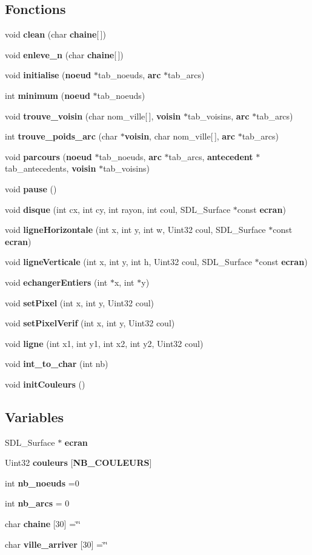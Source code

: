 \subsection*{Fonctions}
\begin{DoxyCompactItemize}
\item 
void {\bf clean} (char {\bf chaine}[$\,$])
\item 
void {\bf enleve\+\_\+n} (char {\bf chaine}[$\,$])
\item 
void {\bf initialise} ({\bf noeud} $\ast$tab\+\_\+noeuds, {\bf arc} $\ast$tab\+\_\+arcs)
\item 
int {\bf minimum} ({\bf noeud} $\ast$tab\+\_\+noeuds)
\item 
void {\bf trouve\+\_\+voisin} (char nom\+\_\+ville[$\,$], {\bf voisin} $\ast$tab\+\_\+voisins, {\bf arc} $\ast$tab\+\_\+arcs)
\item 
int {\bf trouve\+\_\+poids\+\_\+arc} (char $\ast${\bf voisin}, char nom\+\_\+ville[$\,$], {\bf arc} $\ast$tab\+\_\+arcs)
\item 
void {\bf parcours} ({\bf noeud} $\ast$tab\+\_\+noeuds, {\bf arc} $\ast$tab\+\_\+arcs, {\bf antecedent} $\ast$tab\+\_\+antecedents, {\bf voisin} $\ast$tab\+\_\+voisins)
\item 
void {\bf pause} ()
\item 
void {\bf disque} (int cx, int cy, int rayon, int coul, S\+D\+L\+\_\+\+Surface $\ast$const {\bf ecran})
\item 
void {\bf ligne\+Horizontale} (int x, int y, int w, Uint32 coul, S\+D\+L\+\_\+\+Surface $\ast$const {\bf ecran})
\item 
void {\bf ligne\+Verticale} (int x, int y, int h, Uint32 coul, S\+D\+L\+\_\+\+Surface $\ast$const {\bf ecran})
\item 
void {\bf echanger\+Entiers} (int $\ast$x, int $\ast$y)
\item 
void {\bf set\+Pixel} (int x, int y, Uint32 coul)
\item 
void {\bf set\+Pixel\+Verif} (int x, int y, Uint32 coul)
\item 
void {\bf ligne} (int x1, int y1, int x2, int y2, Uint32 coul)
\item 
void {\bf int\+\_\+to\+\_\+char} (int nb)
\item 
void {\bf init\+Couleurs} ()
\end{DoxyCompactItemize}
\subsection*{Variables}
\begin{DoxyCompactItemize}
\item 
S\+D\+L\+\_\+\+Surface $\ast$ {\bf ecran}
\item 
Uint32 {\bf couleurs} [{\bf N\+B\+\_\+\+C\+O\+U\+L\+E\+U\+RS}]
\item 
int {\bf nb\+\_\+noeuds} =0
\item 
int {\bf nb\+\_\+arcs} = 0
\item 
char {\bf chaine} [30] =\char`\"{}\char`\"{}
\item 
char {\bf ville\+\_\+arriver} [30] =\char`\"{}\char`\"{}
\end{DoxyCompactItemize}


